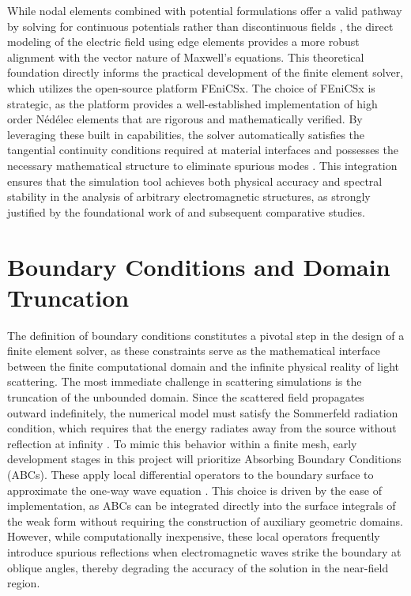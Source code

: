 \documentclass[class=report, crop=false]{standalone}
\begin{document}
While nodal elements combined with potential formulations offer a valid pathway by solving for continuous potentials rather than discontinuous fields \citep{Paulsen1994}, the direct modeling of the electric field using edge elements provides a more robust alignment with the vector nature of Maxwell's equations. This theoretical foundation directly informs the practical development of the finite element solver, which utilizes the open-source platform FEniCSx. The choice of FEniCSx is strategic, as the platform provides a well-established implementation of high order Nédélec elements that are rigorous and mathematically verified. By leveraging these built in capabilities, the solver automatically satisfies the tangential continuity conditions required at material interfaces and possesses the necessary mathematical structure to eliminate spurious modes \citep{Esterhazy2013}. This integration ensures that the simulation tool achieves both physical accuracy and spectral stability in the analysis of arbitrary electromagnetic structures, as strongly justified by the foundational work of \citet{Bossavit1989} and subsequent comparative studies.

\section{Boundary Conditions and Domain Truncation}

The definition of boundary conditions constitutes a pivotal step in the design of a finite element solver, as these constraints serve as the mathematical interface between the finite computational domain and the infinite physical reality of light scattering. The most immediate challenge in scattering simulations is the truncation of the unbounded domain. Since the scattered field propagates outward indefinitely, the numerical model must satisfy the Sommerfeld radiation condition, which requires that the energy radiates away from the source without reflection at infinity \citep{Schwarzbach2009}. To mimic this behavior within a finite mesh, early development stages in this project will prioritize Absorbing Boundary Conditions (ABCs). These apply local differential operators to the boundary surface to approximate the one-way wave equation \citep{Engquist1977}. This choice is driven by the ease of implementation, as ABCs can be integrated directly into the surface integrals of the weak form without requiring the construction of auxiliary geometric domains. However, while computationally inexpensive, these local operators frequently introduce spurious reflections when electromagnetic waves strike the boundary at oblique angles, thereby degrading the accuracy of the solution in the near-field region.
\end{document}
